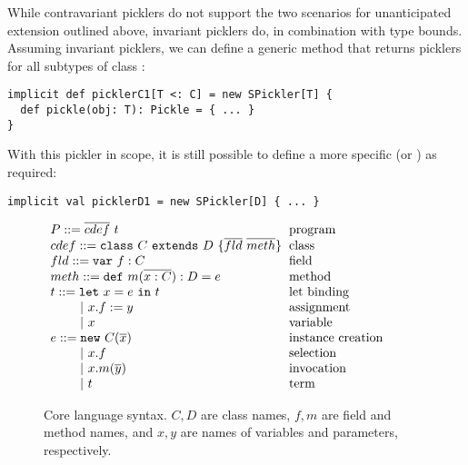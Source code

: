 While contravariant picklers do not support the two scenarios for
unanticipated extension outlined above, invariant picklers do, in combination
with type bounds. Assuming invariant picklers, we can define a generic method
 that returns picklers for all subtypes of class :


\begin{lstlisting}
implicit def picklerC1[T <: C] = new SPickler[T] {
  def pickle(obj: T): Pickle = { ... }
}
\end{lstlisting}

With this pickler in scope, it is still possible to define a more specific
 (or ) as required:

\begin{lstlisting}
implicit val picklerD1 = new SPickler[D] { ... }
\end{lstlisting}

\begin{figure}
  \centering
$\ba[t]{l@{\hspace{2mm}}l}
P    ::=  \seq{cdef}~t                           & \mbox{program}             \\
cdef ::=  \texttt{class}~C~\texttt{extends}~D~\{\seq{fld}~\seq{meth}\} & \mbox{class} \\
fld  ::=  \texttt{var}~f: C                      & \mbox{field}               \\
meth ::=  \texttt{def}~m(\seq{x: C}): D = e      & \mbox{method}              \\
t    ::=  \texttt{let}~x = e~\texttt{in}~t       & \mbox{let binding}         \\
\gap ~|~ x.f := y                                & \mbox{assignment}          \\
\gap ~|~ x                                       & \mbox{variable}            \\
e    ::=  \texttt{new}~C(\seq{x})                & \mbox{instance creation}   \\
\gap ~|~ x.f                                     & \mbox{selection}           \\
\gap ~|~ x.m(\seq{y})                            & \mbox{invocation}          \\
\gap ~|~ t                                       & \mbox{term}                \\
\ea$
  \caption{Core language syntax. $C,D$ are class names, $f,m$ are field and
    method names, and $x,y$ are names of variables and parameters, respectively.}
  \label{fig:lang-syntax}
\end{figure}

